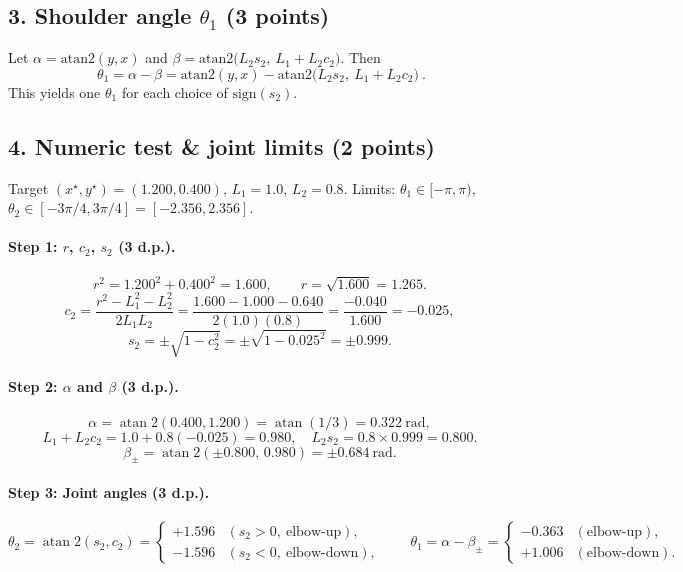 \documentclass[11pt]{article}
\DeclareMathOperator{\atan}{atan}
\begin{document}
\subsection*{3. Shoulder angle $\theta_1$ (3 points)}
Let $\alpha=\mathrm{atan2}(y,x)$ and $\beta=\mathrm{atan2}\!\big(L_2 s_2,\ L_1+L_2 c_2\big)$. Then
\[
\boxed{\ \theta_1=\alpha-\beta
= \mathrm{atan2}(y,x)-\mathrm{atan2}\!\big(L_2 s_2,\ L_1+L_2 c_2\big)\ }.
\]
This yields one $\theta_1$ for each choice of $\mathrm{sign}(s_2)$.

\subsection*{4. Numeric test \& joint limits (2 points)}
Target $(x^\star,y^\star)=(1.200,0.400)$, $L_1=1.0$, $L_2=0.8$.
Limits: $\theta_1\in[-\pi,\pi)$, $\theta_2\in[-3\pi/4,3\pi/4]=[-2.356,2.356]$.

\paragraph{Step 1: $r$, $c_2$, $s_2$ (3 d.p.).}
\[
r^2 = 1.200^2+0.400^2 = 1.600,\qquad r=\sqrt{1.600}= \boxed{1.265}.
\]
\[
c_2=\frac{r^2-L_1^2-L_2^2}{2L_1L_2}
=\frac{1.600-1.000-0.640}{2(1.0)(0.8)}
=\frac{-0.040}{1.600}= \boxed{-0.025},
\]
\[
s_2=\pm\sqrt{1-c_2^2}= \pm\sqrt{1-0.025^2}= \boxed{\pm 0.999}.
\]

\paragraph{Step 2: $\alpha$ and $\beta$ (3 d.p.).}
\[
\alpha=\atan2(0.400,1.200)=\atan(1/3)= \boxed{0.322}\ \text{rad},
\]
\[
L_1+L_2c_2=1.0+0.8(-0.025)=0.980,\quad L_2s_2=0.8\times 0.999=0.800.
\]
\[
\beta_{\pm}=\atan2(\pm 0.800,\,0.980)= \boxed{\pm 0.684}\ \text{rad}.
\]

\paragraph{Step 3: Joint angles (3 d.p.).}
\[
\theta_2=\atan2(s_2,c_2)=
\begin{cases}
\boxed{+1.596} & (s_2>0,\ \text{elbow-up}),\\
\boxed{-1.596} & (s_2<0,\ \text{elbow-down}),
\end{cases}
\qquad
\theta_1=\alpha-\beta_{\pm}=
\begin{cases}
\boxed{-0.363} & (\text{elbow-up}),\\
\boxed{+1.006} & (\text{elbow-down}).
\end{cases}
\]
\end{document}
